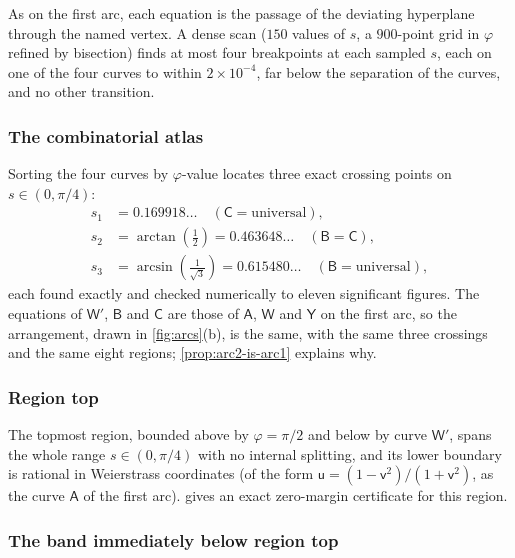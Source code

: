\documentclass[11pt,reqno]{amsart}
\renewcommand{\_}{\origunderscore\allowbreak}
\numberwithin{equation}{section}
\theoremstyle{plain}
\theoremstyle{definition}
\theoremstyle{remark}
\newcommand{\tilt}{\varphi}                  %
\newcommand{\arcp}{s}                        %
\begin{document}
As on the first arc, each equation is the passage of the deviating
hyperplane through the named vertex. A dense scan ($150$ values of
$\arcp$, a $900$-point grid in $\tilt$ refined by bisection) finds at
most four breakpoints at each sampled $\arcp$, each on one of the four
curves to within $2\times10^{-4}$, far below the separation of the
curves, and no other transition.

\subsubsection{The combinatorial atlas}

Sorting the four curves by $\tilt$-value locates three exact crossing
points on $\arcp\in(0,\pi/4)$:
\[
  \begin{aligned}
  \arcp_1 &= 0.169918\ldots \quad (\mathsf C=\text{universal}), \\
  \arcp_2 &= \arctan(\tfrac12) = 0.463648\ldots\quad (\mathsf B=\mathsf C), \\
  \arcp_3 &= \arcsin(\tfrac1{\sqrt3}) = 0.615480\ldots\quad (\mathsf B=\text{universal}),
  \end{aligned}
\]
each found exactly and checked numerically to eleven significant
figures. The equations of $\mathsf W'$, $\mathsf B$ and $\mathsf C$ are
those of $\mathsf A$, $\mathsf W$ and $\mathsf Y$ on the first arc, so the
arrangement, drawn in \cref{fig:arcs}(b), is the same, with the same
three crossings and the same eight regions; \cref{prop:arc2-is-arc1}
explains why.

\subsubsection{Region top}

The topmost region, bounded above by $\tilt=\pi/2$ and below by curve
$\mathsf W'$, spans the whole range $\arcp\in(0,\pi/4)$ with no internal
splitting, and its lower boundary is rational in Weierstrass coordinates
(of the form $\mathsf u=(1-\mathsf v^2)/(1+\mathsf v^2)$, as the curve
$\mathsf A$ of the first arc).  gives an exact
zero-margin certificate for this region.

\subsubsection{The band immediately below region top}\label{sec:band-below-top-new}
\end{document}
